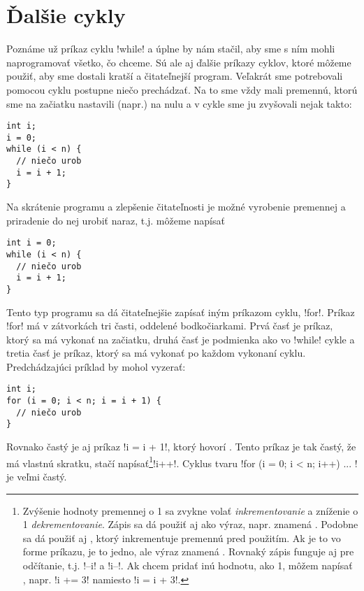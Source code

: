 \chapter{Ďalšie cykly}

Poznáme už príkaz cyklu \prg!while! a úplne by nám stačil, aby sme s ním mohli 
naprogramovať všetko, čo chceme. Sú ale aj ďalšie príkazy cyklov, ktoré môžeme
použiť, aby sme dostali kratší a čitateľnejší program. Veľakrát sme potrebovali
 pomocou cyklu postupne niečo prechádzať. Na to sme vždy mali premennú,
ktorú sme na začiatku nastavili (napr.) na nulu
a v cykle sme ju zvyšovali nejak takto:\\

\begin{lstlisting}
int i;
i = 0;
while (i < n) {
  // niečo urob
  i = i + 1;
}
\end{lstlisting}

Na skrátenie programu a zlepšenie čitateľnosti je možné vyrobenie premennej
a priradenie do nej urobiť naraz, t.j. môžeme napísať\\

\begin{lstlisting} 
int i = 0;
while (i < n) {
  // niečo urob
  i = i + 1;
}
\end{lstlisting}

Tento typ programu sa dá čitateľnejšie zapísať iným príkazom cyklu, \prg!for!.
Príkaz \prg!for! má v zátvorkách tri časti, oddelené bodkočiarkami. Prvá časť
je príkaz, ktorý sa má vykonať na začiatku, druhá časť je podmienka ako vo \prg!while!
cykle a tretia časť je príkaz, ktorý sa má vykonať po každom vykonaní cyklu.
Predchádzajúci príklad by mohol vyzerať:\\

\begin{lstlisting}
int i;
for (i = 0; i < n; i = i + 1) {
  // niečo urob
}
\end{lstlisting}


Rovnako častý je aj príkaz \prg!i = i + 1!, ktorý hovorí . Tento príkaz je tak
častý, že má vlastnú skratku, stačí napísať\footnote{\label{foot.inc-vyraz}
  Zvýšenie hodnoty premennej o 1 sa zvykne volať {\em inkrementovanie} a zníženie
  o 1 {\em dekrementovanie}.
  Zápis  sa dá použiť
  aj ako výraz, napr.  znamená .
  Podobne sa dá použiť aj , ktorý inkrementuje premennú pred použitím. 
  Ak je to vo forme príkazu, je to jedno, ale výraz \hbox{} znamená
  .
  Rovnaký zápis funguje aj pre odčítanie, t.j. \prg!--i! a \prg!i--!.
  Ak chcem pridať inú hodnotu, ako 1, môžem napísať \vb{+=}, napr. \prg!i += 3! namiesto
  \prg!i = i + 3!.
}\prg!i++!. Cyklus tvaru
\prg!for (i = 0; i < n; i++) { ... }! 
je veľmi častý. 

